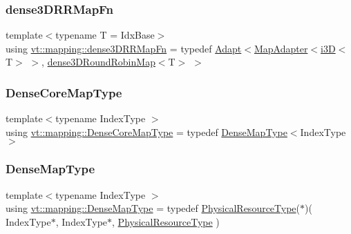 \mbox{\label{namespacevt_1_1mapping_acdcf6cb63043d58e9c50144bdc8b59dd}} 
\subsubsection{\texorpdfstring{dense3\+D\+R\+R\+Map\+Fn}{dense3DRRMapFn}}
{\footnotesize\ttfamily template$<$typename T  = Idx\+Base$>$ \\
using \hyperlink{namespacevt_1_1mapping_acdcf6cb63043d58e9c50144bdc8b59dd}{vt\+::mapping\+::dense3\+D\+R\+R\+Map\+Fn} = typedef \hyperlink{namespacevt_1_1mapping_ab3efa0ad45a85d80210d4acef3bb6c22}{Adapt}$<$\hyperlink{namespacevt_1_1mapping_a41b113c28bb6430fbcb5be66e08ccf9f}{Map\+Adapter}$<$\hyperlink{namespacevt_1_1mapping_af435b967b9ed1ccb5ec4effdbd9abd13}{i3D}$<$T$>$ $>$, \hyperlink{namespacevt_1_1mapping_aa48fa3b830b637787c584dbac5bba6db}{dense3\+D\+Round\+Robin\+Map}$<$T$>$ $>$}

\mbox{\label{namespacevt_1_1mapping_ac198c707792d29c7e3106fb89c3f3f92}} 
\subsubsection{\texorpdfstring{Dense\+Core\+Map\+Type}{DenseCoreMapType}}
{\footnotesize\ttfamily template$<$typename Index\+Type $>$ \\
using \hyperlink{namespacevt_1_1mapping_ac198c707792d29c7e3106fb89c3f3f92}{vt\+::mapping\+::\+Dense\+Core\+Map\+Type} = typedef \hyperlink{namespacevt_1_1mapping_a64f0fc107b569bb6644f1b015c6e7ad8}{Dense\+Map\+Type}$<$Index\+Type$>$}

\mbox{\label{namespacevt_1_1mapping_a64f0fc107b569bb6644f1b015c6e7ad8}} 
\subsubsection{\texorpdfstring{Dense\+Map\+Type}{DenseMapType}}
{\footnotesize\ttfamily template$<$typename Index\+Type $>$ \\
using \hyperlink{namespacevt_1_1mapping_a64f0fc107b569bb6644f1b015c6e7ad8}{vt\+::mapping\+::\+Dense\+Map\+Type} = typedef \hyperlink{namespacevt_a2dc36fcada816dc6d11774d650328ee9}{Physical\+Resource\+Type}($\ast$)( Index\+Type$\ast$, Index\+Type$\ast$, \hyperlink{namespacevt_a2dc36fcada816dc6d11774d650328ee9}{Physical\+Resource\+Type} )}

